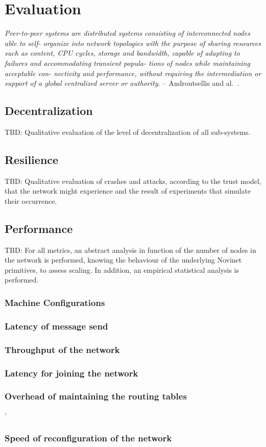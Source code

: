 \chapter{Evaluation}

\textit{Peer-to-peer systems are distributed systems consisting of interconnected nodes able to self- organize into network topologies with the purpose of sharing resources such as content, CPU cycles, storage and bandwidth, capable of adapting to failures and accommodating transient popula- tions of nodes while maintaining acceptable con- nectivity and performance, without requiring the intermediation or support of a global centralized server or authority.} -- Androutsellis and al.~\cite{Androutsellis-Theotokis:2004}.

\section{Decentralization}

TBD: Qualitative evaluation of the level of decentralization of all sub-systems.

\section{Resilience}

TBD: Qualitative evaluation of crashes and attacks, according to the trust model, that the network might experience and the result of experiments that simulate their occurrence.

\section{Performance}

TBD: For all metrics, an abstract analysis in function of the number of nodes in the network is performed, knowing the behaviour of the underlying Novinet primitives, to assess scaling. In addition, an empirical statistical analysis is performed.

\subsection{Machine Configurations}

\subsection{Latency of message send}

\subsection{Throughput of the network}

\subsection{Latency for joining the network}

\subsection{Overhead of maintaining the routing tables}

'\subsection{Speed of reconfiguration of the network}
